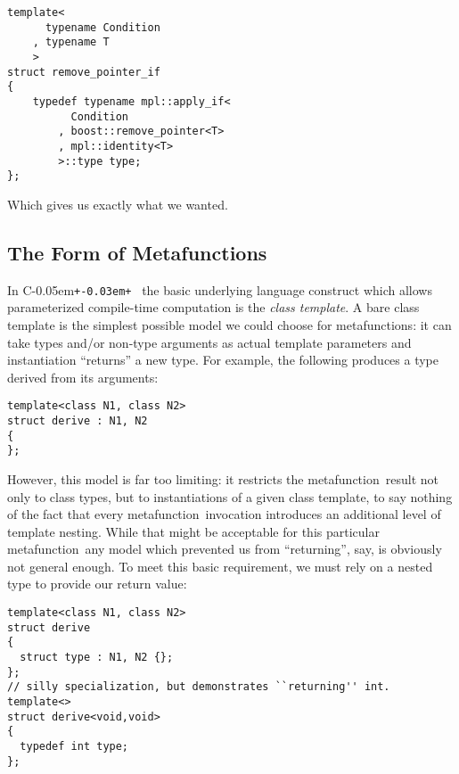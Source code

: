 \documentclass{kapproc}
\newcommand{\Cpp}{C\kern-0.05em\texttt{+\kern-0.03em+}%
}
\newcommand{\mfn}{meta\-func\-tion}
\newcommand{\mfns}{meta\-func\-tions}
\begin{document}
{\small
\begin{codesamp}\begin{verbatim}
template<
      typename Condition
    , typename T
    >
struct remove_pointer_if
{
    typedef typename mpl::apply_if<
          Condition
        , boost::remove_pointer<T>
        , mpl::identity<T>
        >::type type;
};
\end{verbatim}
\end{codesamp}
}

Which gives us exactly what we wanted.


\subsection{The Form of Metafunctions}

In \Cpp\, the basic underlying language construct which allows
parameterized compile-time computation is the \emph{class template}. A
bare class template is the simplest possible model we could choose for
\mfns: it can take types and/or non-type arguments as actual template
parameters and instantiation ``returns'' a new type. For example, the
following produces a type derived from its arguments:

{\small
\begin{codesamp}\begin{verbatim}
template<class N1, class N2>
struct derive : N1, N2
{
};
\end{verbatim}
\end{codesamp}
}

However, this model is far too limiting: it restricts the \mfn\ result
not only to class types, but to instantiations of a given class
template, to say nothing of the fact that every \mfn\ invocation
introduces an additional level of template nesting. While that might
be acceptable for this particular \mfn\, any model which prevented us
from ``returning'', say,  is obviously not general
enough. To meet this basic requirement, we must rely on a nested type
to provide our return value:

{\small
\begin{codesamp}\begin{verbatim}
template<class N1, class N2>
struct derive
{
  struct type : N1, N2 {};
};
// silly specialization, but demonstrates ``returning'' int.
template<>
struct derive<void,void>
{
  typedef int type;
};
\end{verbatim}
\end{codesamp}
}
\end{document}
